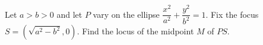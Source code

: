 Let $a>b>0$ and let $P$ vary on the ellipse $\dfrac{x^2}{a^2}+\dfrac{y^2}{b^2}=1$. Fix the focus $S=(\sqrt{a^2-b^2},0)$. Find the locus of the midpoint $M$ of $PS$.
